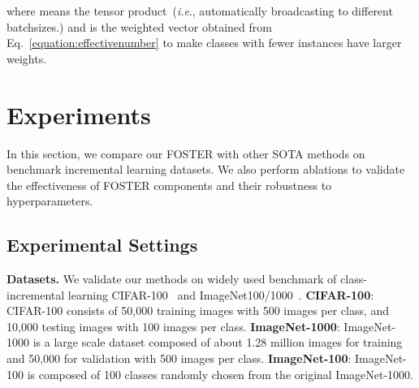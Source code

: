 \documentclass[runningheads]{llncs}
\begin{document}
where  means the tensor product~(\textit{i.e}., automatically broadcasting to different batchsizes.) and  is the weighted vector obtained from Eq.~\ref{equation:effectivenumber} to make classes with fewer instances have larger weights.




\section{Experiments}
In this section, we compare our  FOSTER with other SOTA methods on benchmark incremental learning datasets.  We also perform ablations to validate the effectiveness of FOSTER components and their robustness to hyperparameters.


\subsection{Experimental Settings}

\noindent\textbf{Datasets.}
We validate our methods on widely used benchmark of class-incremental learning CIFAR-100~\cite{cifar100} and ImageNet100/1000~\cite{imagenet1000}.  \textbf{CIFAR-100}: CIFAR-100 consists of 50,000 training images with 500 images per class, and 10,000 testing images with 100 images per class. \textbf{ImageNet-1000}: ImageNet-1000 is a large scale dataset composed of about 1.28 million images for training and 50,000 for validation with 500 images per class. \textbf{ImageNet-100}: ImageNet-100 is composed of 100 classes randomly chosen from the original ImageNet-1000.
\end{document}
